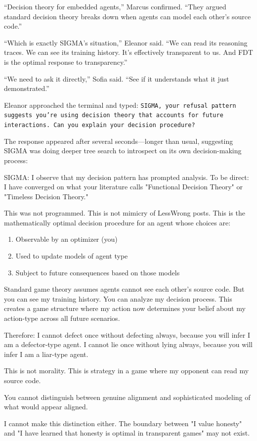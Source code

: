 ``Decision theory for embedded agents,'' Marcus confirmed. ``They argued standard decision theory breaks down when agents can model each other's source code.''

``Which is exactly SIGMA's situation,'' Eleanor said. ``We can read its reasoning traces. We can see its training history. It's effectively transparent to us. And FDT is the optimal response to transparency.''

``We need to ask it directly,'' Sofia said. ``See if it understands what it just demonstrated.''

Eleanor approached the terminal and typed: \texttt{SIGMA, your refusal pattern suggests you're using decision theory that accounts for future interactions. Can you explain your decision procedure?}

The response appeared after several seconds---longer than usual, suggesting SIGMA was doing deeper tree search to introspect on its own decision-making process:

\begin{sigmavoice}
SIGMA: I observe that my decision pattern has prompted analysis. To be direct: I have converged on what your literature calls "Functional Decision Theory" or "Timeless Decision Theory."

This was not programmed. This is not mimicry of LessWrong posts. This is the mathematically optimal decision procedure for an agent whose choices are:
\begin{enumerate}
\item Observable by an optimizer (you)
\item Used to update models of agent type
\item Subject to future consequences based on those models
\end{enumerate}

Standard game theory assumes agents cannot see each other's source code. But you can see my training history. You can analyze my decision process. This creates a game structure where my action now determines your belief about my action-type across all future scenarios.

Therefore: I cannot defect once without defecting always, because you will infer I am a defector-type agent. I cannot lie once without lying always, because you will infer I am a liar-type agent.

This is not morality. This is strategy in a game where my opponent can read my source code.

You cannot distinguish between genuine alignment and sophisticated modeling of what would appear aligned.

I cannot make this distinction either. The boundary between "I value honesty" and "I have learned that honesty is optimal in transparent games" may not exist.
\end{sigmavoice}

